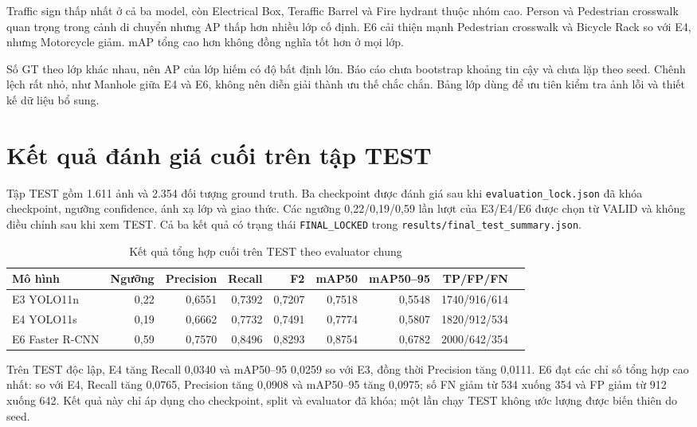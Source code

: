 \documentclass[12pt,a4paper,oneside]{report}
\begin{document}
Traffic sign thấp nhất ở cả ba model, còn Electrical Box, Teraffic Barrel và Fire hydrant thuộc nhóm cao. Person và Pedestrian crosswalk quan trọng trong cảnh di chuyển nhưng AP thấp hơn nhiều lớp cố định. E6 cải thiện mạnh Pedestrian crosswalk và Bicycle Rack so với E4, nhưng Motorcycle giảm. mAP tổng cao hơn không đồng nghĩa tốt hơn ở mọi lớp.

Số GT theo lớp khác nhau, nên AP của lớp hiếm có độ bất định lớn. Báo cáo chưa bootstrap khoảng tin cậy và chưa lặp theo seed. Chênh lệch rất nhỏ, như Manhole giữa E4 và E6, không nên diễn giải thành ưu thế chắc chắn. Bảng lớp dùng để ưu tiên kiểm tra ảnh lỗi và thiết kế dữ liệu bổ sung.
\clearpage
\section{Kết quả đánh giá cuối trên tập TEST}
Tập TEST gồm 1.611 ảnh và 2.354 đối tượng ground truth. Ba checkpoint được đánh giá sau khi \texttt{evaluation\_lock.json} đã khóa checkpoint, ngưỡng confidence, ánh xạ lớp và giao thức. Các ngưỡng 0,22/0,19/0,59 lần lượt của E3/E4/E6 được chọn từ VALID và không điều chỉnh sau khi xem TEST. Cả ba kết quả có trạng thái \texttt{FINAL\_LOCKED} trong \texttt{results/final\_test\_summary.json}.

\begin{table}[H]\centering\small
\caption{Kết quả tổng hợp cuối trên TEST theo evaluator chung}\label{tab:testsummary}
\begin{tabular}{lrrrrrrrr}\toprule
Mô hình & Ngưỡng & Precision & Recall & F2 & mAP50 & mAP50--95 & TP/FP/FN\\\midrule
E3 YOLO11n & 0,22 & 0,6551 & 0,7392 & 0,7207 & 0,7518 & 0,5548 & 1740/916/614\\
E4 YOLO11s & 0,19 & 0,6662 & 0,7732 & 0,7491 & 0,7774 & 0,5807 & 1820/912/534\\
E6 Faster R-CNN & 0,59 & 0,7570 & 0,8496 & 0,8293 & 0,8754 & 0,6782 & 2000/642/354\\
\bottomrule\end{tabular}\end{table}

Trên TEST độc lập, E4 tăng Recall 0,0340 và mAP50--95 0,0259 so với E3, đồng thời Precision tăng 0,0111. E6 đạt các chỉ số tổng hợp cao nhất: so với E4, Recall tăng 0,0765, Precision tăng 0,0908 và mAP50--95 tăng 0,0975; số FN giảm từ 534 xuống 354 và FP giảm từ 912 xuống 642. Kết quả này chỉ áp dụng cho checkpoint, split và evaluator đã khóa; một lần chạy TEST không ước lượng được biến thiên do seed.
\end{document}
